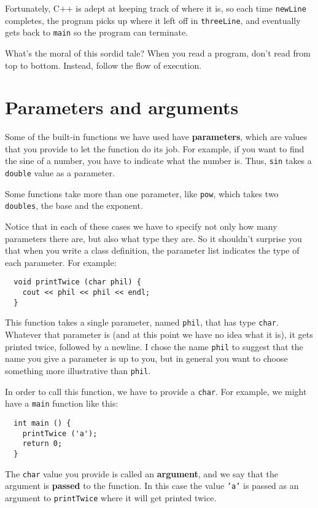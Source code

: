Fortunately, C++ is adept at keeping track of where it is, so
each time {\tt newLine} completes, the program picks up where it left
off in {\tt threeLine}, and eventually gets back to {\tt main} so the
program can terminate.

What's the moral of this sordid tale?  When you read a program, don't
read from top to bottom.  Instead, follow the flow of execution.

\section {Parameters and arguments}

Some of the built-in functions we have used have {\bf parameters},
which are values that you provide to let the function do its
job.  For example, if you want to find the sine of a number,
you have to indicate what the number is.  Thus, {\tt sin}
takes a {\tt double} value as a parameter.

Some functions take more than one parameter, like {\tt pow},
which takes two {\tt doubles}, the base and the exponent.

Notice that in each of these cases we have to specify not
only how many parameters there are, but also what type they
are.  So it shouldn't surprise you that when you write a
class definition, the parameter list indicates the type of
each parameter.  For example:

\begin{verbatim}
  void printTwice (char phil) {
    cout << phil << phil << endl;
  }
\end{verbatim}
%
This function takes a single parameter, named {\tt phil}, that
has type {\tt char}.  Whatever that parameter is (and at
this point we have no idea what it is), it gets printed
twice, followed by a newline.
I chose the name {\tt phil} to suggest that the name
you give a parameter is up to you, but in general you want to
choose something more illustrative than {\tt phil}.

In order to call this function, we have to provide a {\tt char}.
For example, we might have a {\tt main} function like this:

\begin{verbatim}
  int main () {
    printTwice ('a');
    return 0;
  }
\end{verbatim}
%
The {\tt char} value you provide is called an {\bf argument}, and we
say that the argument is {\bf passed} to the function.  In this
case the value {\tt 'a'} is passed as an argument
to {\tt printTwice} where it will get printed twice.

